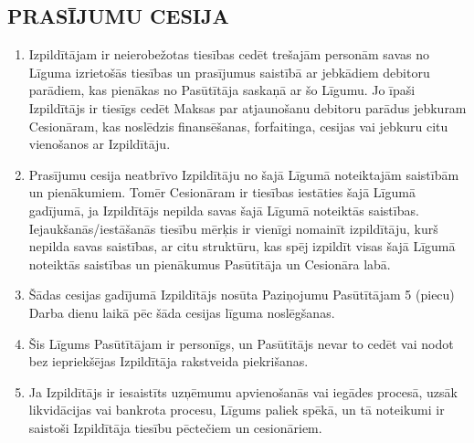 \begin{multicols}{2}
\subsection{PRASĪJUMU CESIJA}
\begin{enumerate}
	\item Izpildītājam ir neierobežotas tiesības cedēt trešajām personām savas no Līguma izrietošās tiesības un prasījumus saistībā ar jebkādiem debitoru parādiem, kas pienākas no Pasūtītāja saskaņā ar šo Līgumu. Jo īpaši Izpildītājs ir tiesīgs cedēt Maksas par atjaunošanu debitoru parādus jebkuram Cesionāram, kas noslēdzis finansēšanas, forfaitinga, cesijas vai jebkuru citu vienošanos ar Izpildītāju.
	\item Prasījumu cesija neatbrīvo Izpildītāju no šajā Līgumā noteiktajām saistībām un pienākumiem. Tomēr Cesionāram ir tiesības iestāties šajā Līgumā gadījumā, ja Izpildītājs nepilda savas šajā Līgumā noteiktās saistības. Iejaukšanās/iestāšanās tiesību mērķis ir vienīgi nomainīt izpildītāju, kurš nepilda savas saistības, ar citu struktūru, kas spēj izpildīt visas šajā Līgumā noteiktās saistības un pienākumus Pasūtītāja un Cesionāra labā.
	\item Šādas cesijas gadījumā Izpildītājs nosūta Paziņojumu Pasūtītājam 5 (piecu) Darba dienu laikā pēc šāda cesijas līguma noslēgšanas.
	\item Šis Līgums Pasūtītājam ir personīgs, un Pasūtītājs nevar to cedēt vai nodot bez iepriekšējas Izpildītāja rakstveida piekrišanas.
	\item Ja Izpildītājs ir iesaistīts uzņēmumu apvienošanās vai iegādes procesā, uzsāk likvidācijas vai bankrota procesu, Līgums paliek spēkā, un tā noteikumi ir saistoši Izpildītāja tiesību pēctečiem un cesionāriem.
\end{enumerate}


\end{multicols}
